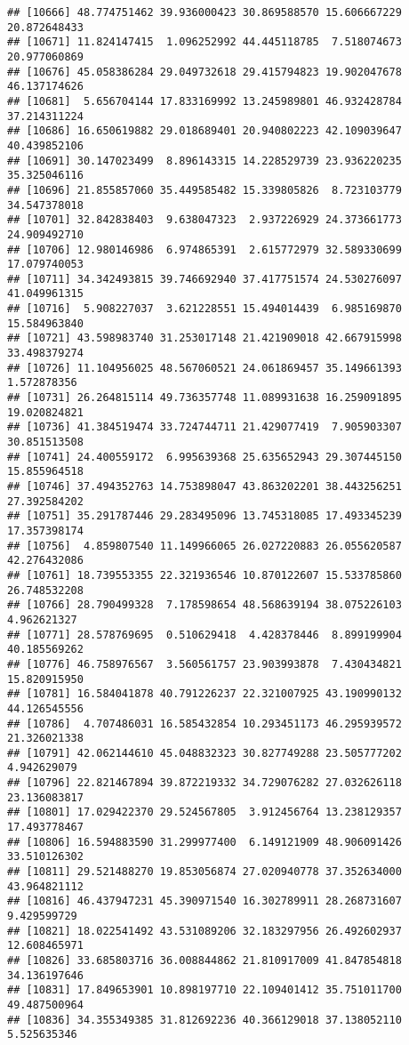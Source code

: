 \documentclass[
]{article}
\begin{document}
\begin{verbatim}
## [10666] 48.774751462 39.936000423 30.869588570 15.606667229 20.872648433
## [10671] 11.824147415  1.096252992 44.445118785  7.518074673 20.977060869
## [10676] 45.058386284 29.049732618 29.415794823 19.902047678 46.137174626
## [10681]  5.656704144 17.833169992 13.245989801 46.932428784 37.214311224
## [10686] 16.650619882 29.018689401 20.940802223 42.109039647 40.439852106
## [10691] 30.147023499  8.896143315 14.228529739 23.936220235 35.325046116
## [10696] 21.855857060 35.449585482 15.339805826  8.723103779 34.547378018
## [10701] 32.842838403  9.638047323  2.937226929 24.373661773 24.909492710
## [10706] 12.980146986  6.974865391  2.615772979 32.589330699 17.079740053
## [10711] 34.342493815 39.746692940 37.417751574 24.530276097 41.049961315
## [10716]  5.908227037  3.621228551 15.494014439  6.985169870 15.584963840
## [10721] 43.598983740 31.253017148 21.421909018 42.667915998 33.498379274
## [10726] 11.104956025 48.567060521 24.061869457 35.149661393  1.572878356
## [10731] 26.264815114 49.736357748 11.089931638 16.259091895 19.020824821
## [10736] 41.384519474 33.724744711 21.429077419  7.905903307 30.851513508
## [10741] 24.400559172  6.995639368 25.635652943 29.307445150 15.855964518
## [10746] 37.494352763 14.753898047 43.863202201 38.443256251 27.392584202
## [10751] 35.291787446 29.283495096 13.745318085 17.493345239 17.357398174
## [10756]  4.859807540 11.149966065 26.027220883 26.055620587 42.276432086
## [10761] 18.739553355 22.321936546 10.870122607 15.533785860 26.748532208
## [10766] 28.790499328  7.178598654 48.568639194 38.075226103  4.962621327
## [10771] 28.578769695  0.510629418  4.428378446  8.899199904 40.185569262
## [10776] 46.758976567  3.560561757 23.903993878  7.430434821 15.820915950
## [10781] 16.584041878 40.791226237 22.321007925 43.190990132 44.126545556
## [10786]  4.707486031 16.585432854 10.293451173 46.295939572 21.326021338
## [10791] 42.062144610 45.048832323 30.827749288 23.505777202  4.942629079
## [10796] 22.821467894 39.872219332 34.729076282 27.032626118 23.136083817
## [10801] 17.029422370 29.524567805  3.912456764 13.238129357 17.493778467
## [10806] 16.594883590 31.299977400  6.149121909 48.906091426 33.510126302
## [10811] 29.521488270 19.853056874 27.020940778 37.352634000 43.964821112
## [10816] 46.437947231 45.390971540 16.302789911 28.268731607  9.429599729
## [10821] 18.022541492 43.531089206 32.183297956 26.492602937 12.608465971
## [10826] 33.685803716 36.008844862 21.810917009 41.847854818 34.136197646
## [10831] 17.849653901 10.898197710 22.109401412 35.751011700 49.487500964
## [10836] 34.355349385 31.812692236 40.366129018 37.138052110  5.525635346

\end{verbatim}
\end{document}
